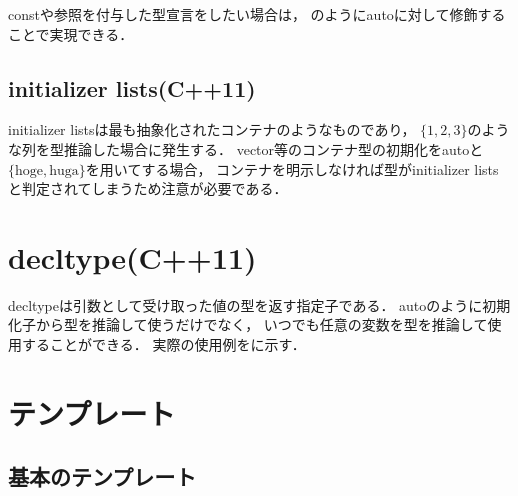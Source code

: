 constや参照を付与した型宣言をしたい場合は，
のようにautoに対して修飾することで実現できる．



\subsection{initializer lists(C++11)}
initializer listsは最も抽象化されたコンテナのようなものであり，
$\{1,2,3\}$のような列を型推論した場合に発生する．
vector等のコンテナ型の初期化をautoと$\{\textrm{hoge},\textrm{huga}\}$を用いてする場合，
コンテナを明示しなければ型がinitializer listsと判定されてしまうため注意が必要である．


\section{decltype(C++11)}
decltypeは引数として受け取った値の型を返す指定子である．
autoのように初期化子から型を推論して使うだけでなく，
いつでも任意の変数を型を推論して使用することができる．
実際の使用例をに示す．


\subsection{}





\section{テンプレート}

\subsection{基本のテンプレート}

